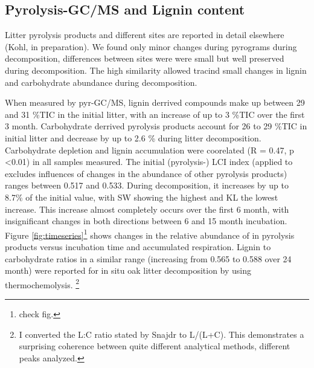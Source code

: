 \documentclass[authoryear,preprint,review,12pt]{elsarticle}
\begin{document}
\subsection{Pyrolysis-GC/MS and Lignin content}

Litter pyrolysis products and different sites are reported in detail elsewhere (Kohl, in preparation). We found only minor changes during pyrograms during decomposition, differences between sites were were small but well preserved during decomposition. The high similarity allowed tracind small changes in lignin and carbohydrate abundance during decomposition. %

When measured by pyr-GC/MS, lignin derrived compounds make up between 29 and 31 \%TIC in the initial litter, with an increase of up to 3 \%TIC over the first 3 month. Carbohydrate derrived pyrolysis products account for 26 to 29 \%TIC in initial litter and decrease by up to 2.6 \% during litter decomposition. Carbohydrate depletion and lignin accumulation were coorelated (R = 0.47, p \textless 0.01) in all samples measured. The initial (pyrolysis-) LCI index (applied to excludes influences of changes in the abundance of other pyrolysis products) ranges between 0.517 and 0.533. During decomposition, it increases by up to 8.7\% of the initial value, with SW showing the highest and KL the lowest increase. This increase almost completely occurs over the first 6 month, with insignificant changes in both directions between 6 and 15 month incubation. Figure \ref{fig:timeseries}\footnote{check fig.} shows changes in the relative abundance of in pyrolysis products versus incubation time and accumulated respiration. Lignin to carbohydrate ratios in a similar range (increasing from 0.565 to 0.588 over 24 month) were reported for in situ oak litter decomposition by \cite{Snajdr2010} using thermochemolysis. \footnote{I converted the L:C ratio stated by Snajdr to L/(L+C). This demonstrates a surprising coherence between quite different analytical methods, different peaks analyzed.}
\end{document}
